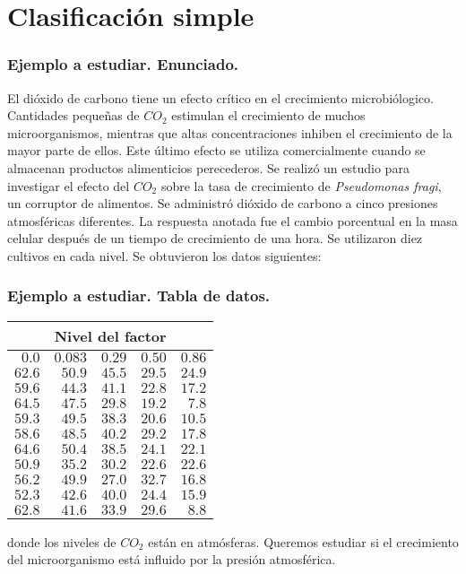 \section{Clasificación simple}
\begin{frame}
\frametitle{Ejemplo a estudiar. Enunciado.}
El dióxido de carbono tiene un efecto crítico en el crecimiento microbiólogico. Cantidades pequeñas de $CO_2$ estimulan el crecimiento de muchos microorganismos, mientras que altas concentraciones inhiben el crecimiento de la mayor parte de ellos. Este último efecto se utiliza comercialmente cuando se almacenan productos alimenticios perecederos. Se realizó un estudio para investigar el efecto del $CO_2$ sobre la tasa de crecimiento de {\it Pseudomonas fragi}, un corruptor de alimentos. Se administró dióxido de carbono a cinco presiones atmosféricas diferentes. La respuesta anotada fue el cambio porcentual en la masa celular después de un tiempo de crecimiento de una hora. Se utilizaron diez cultivos en cada nivel. Se obtuvieron los datos siguientes:
\end{frame}

\begin{frame}
\frametitle{Ejemplo a estudiar. Tabla de datos.}
\begin{center}
\begin{tabular}{rrrrr}
\multicolumn{5}{c}{Nivel del factor}\\\hline
$0.0$&$0.083$&$0.29$&$0.50$&$0.86$\\\hline
$62.6$&$50.9$&$45.5$&$29.5$&$24.9$\\
$59.6$&$44.3$&$41.1$&$22.8$&$17.2$\\
$64.5$&$47.5$&$29.8$&$19.2$&$7.8$\\
$59.3$&$49.5$&$38.3$&$20.6$&$10.5$\\
$58.6$&$48.5$&$40.2$&$29.2$&$17.8$\\
$64.6$&$50.4$&$38.5$&$24.1$&$22.1$\\
$50.9$&$35.2$&$30.2$&$22.6$&$22.6$\\
$56.2$&$49.9$&$27.0$&$32.7$&$16.8$\\
$52.3$&$42.6$&$40.0$&$24.4$&$15.9$\\
$62.8$&$41.6$&$33.9$&$29.6$&$8.8$\\
\end{tabular}
\end{center}
donde los niveles de $CO_2$ están en atmósferas. Queremos estudiar si el crecimiento del microorganismo está influido por la presión atmosférica.
\end{frame}

